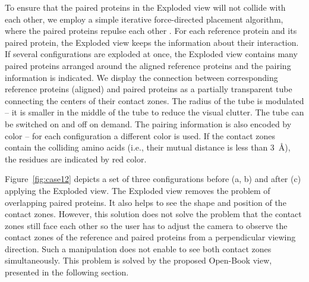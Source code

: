 \documentclass{bmcart}
\def\OpBook {Open-Book view\xspace}
\def\ExpView {Exploded view\xspace}
\begin{document}
To ensure that the paired proteins in the Exploded view will not collide with each other, we employ a simple iterative force-directed placement algorithm, where the paired proteins repulse each other \cite{fruchterman1991graph}.
For each reference protein and its paired protein, the \ExpView keeps the information about their interaction.
If several configurations are exploded at once, the \ExpView contains many paired proteins arranged around the aligned reference proteins and the pairing information is indicated.
We display the connection between corresponding reference proteins (aligned) and paired proteins as a partially transparent tube connecting the centers of their contact zones.
The radius of the tube is modulated -- it is smaller in the middle of the tube to reduce the visual clutter.
The tube can be switched on and off on demand.
The pairing information is also encoded by color -- for each configuration a different color is used.
If the contact zones contain the colliding amino acids (i.e., their mutual distance is less than 3~\AA), the residues are indicated by red color.

Figure~\ref{fig:case12} depicts a set of three configurations before (a, b) and after (c) applying the \ExpView.
The Exploded view removes the problem of overlapping paired proteins.
It also helps to see the shape and position of the contact zones.
However, this solution does not solve the problem that the contact zones still face each other so the user has to adjust the camera to observe the contact zones of the reference and paired proteins from a perpendicular viewing direction. 
Such a manipulation does not enable to see both contact zones simultaneously.
This problem is solved by the proposed \OpBook, presented in the following section.
\end{document}
